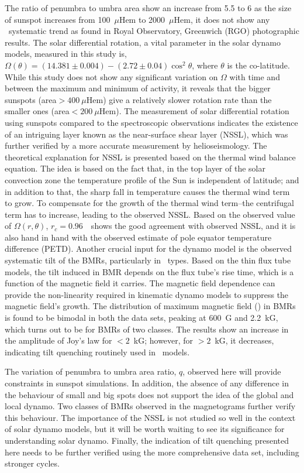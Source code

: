 The ratio of penumbra to umbra area show an increase from 5.5 to 6 as the size of sunspot increases from 100~$\mu$Hem to 2000~$\mu$Hem, it does not show any \lt\ systematic trend as found in Royal Observatory, Greenwich (RGO) photographic results. The solar differential rotation, a  vital parameter in the solar dynamo models, measured in this study is, $\Omega (\theta)= (14.381\pm0.004)-(2.72\pm0.04)\cos^2\theta$, where $\theta$ is the co-latitude. While this study does not show any significant variation on $\Omega$ with time and between the maximum and minimum of activity, it reveals that the bigger sunspots (area$>400~\mu$Hem) give a relatively slower rotation rate than the smaller ones (area$<200~\mu$Hem). The measurement of solar differential rotation using sunspots compared to the spectroscopic observations indicates the existence of an intriguing layer known as the near-surface shear layer (NSSL), which was further verified by a more accurate measurement by helioseismology. The theoretical explanation for NSSL is presented based on the thermal wind balance equation. The idea is based on the fact that, in the top layer of the solar convection zone the temperature profile of the Sun is  independent of latitude; and in addition to that, the sharp fall in temperature causes the thermal wind term to grow. To compensate for the growth of the thermal wind term--the centrifugal term has to increase, leading to the observed NSSL. Based on the observed value of $\Omega (r,\theta)$, $r_c=0.96$~\Rsun\ shows the good agreement with observed NSSL, and it is also hand in hand with the observed estimate of pole equator temperature difference (PETD). Another crucial input for the dynamo model is the observed systematic tilt of the BMRs, particularly in \bl\ types. Based on the thin flux tube models, the tilt induced in BMR depends on the flux tube's rise time, which is a function of the magnetic field it carries. The magnetic field dependence can provide the non-linearity required in kinematic dynamo models to suppress the magnetic field's growth. The distribution of maximum magnetic field (\Bmax) in BMRs is found to be bimodal in both the data sets, peaking at 600~G and 2.2~kG, which turns out to be for BMRs of two classes. The results show an increase in the amplitude of Joy's law for \Bmax$<2$~kG; however, for \Bmax$>2$~kG, it decreases, indicating tilt quenching routinely used in \bl\ models.

The variation of penumbra to umbra area ratio, $q$, observed here will provide constraints in sunspot simulations. In addition, the absence of any difference in the behaviour of small and big spots does not support the idea of the global and local dynamo. Two classes of BMRs observed in the magnetograms further verify this behaviour. The importance of the NSSL is not studied so well in the context of solar dynamo models, but it will be worth waiting to see its significance for understanding solar dynamo. Finally, the indication of tilt quenching presented here needs to be further verified using the more comprehensive data set, including stronger cycles.


\pagebreak
\newpage